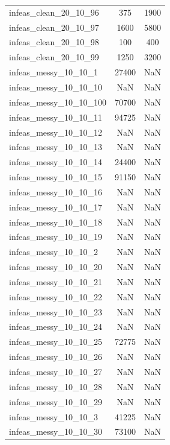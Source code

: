 \begin{longtable}{lcc}
infeas\_clean\_20\_10\_96  &      375 &   1900 \\
infeas\_clean\_20\_10\_97  &     1600 &   5800 \\
infeas\_clean\_20\_10\_98  &      100 &    400 \\
infeas\_clean\_20\_10\_99  &     1250 &   3200 \\
infeas\_messy\_10\_10\_1   &    27400 &    NaN \\
infeas\_messy\_10\_10\_10  &      NaN &    NaN \\
infeas\_messy\_10\_10\_100 &    70700 &    NaN \\
infeas\_messy\_10\_10\_11  &    94725 &    NaN \\
infeas\_messy\_10\_10\_12  &      NaN &    NaN \\
infeas\_messy\_10\_10\_13  &      NaN &    NaN \\
infeas\_messy\_10\_10\_14  &    24400 &    NaN \\
infeas\_messy\_10\_10\_15  &    91150 &    NaN \\
infeas\_messy\_10\_10\_16  &      NaN &    NaN \\
infeas\_messy\_10\_10\_17  &      NaN &    NaN \\
infeas\_messy\_10\_10\_18  &      NaN &    NaN \\
infeas\_messy\_10\_10\_19  &      NaN &    NaN \\
infeas\_messy\_10\_10\_2   &      NaN &    NaN \\
infeas\_messy\_10\_10\_20  &      NaN &    NaN \\
infeas\_messy\_10\_10\_21  &      NaN &    NaN \\
infeas\_messy\_10\_10\_22  &      NaN &    NaN \\
infeas\_messy\_10\_10\_23  &      NaN &    NaN \\
infeas\_messy\_10\_10\_24  &      NaN &    NaN \\
infeas\_messy\_10\_10\_25  &    72775 &    NaN \\
infeas\_messy\_10\_10\_26  &      NaN &    NaN \\
infeas\_messy\_10\_10\_27  &      NaN &    NaN \\
infeas\_messy\_10\_10\_28  &      NaN &    NaN \\
infeas\_messy\_10\_10\_29  &      NaN &    NaN \\
infeas\_messy\_10\_10\_3   &    41225 &    NaN \\
infeas\_messy\_10\_10\_30  &    73100 &    NaN \\

\end{longtable}
